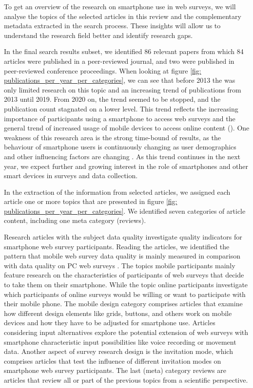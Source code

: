 To get an overview of the research on smartphone use in web surveys, we will analyse the topics of the selected articles in this review and the complementary metadata extracted in the search process. These insights will allow us to understand the research field better and identify research gaps. 

In the final search results subset, we identified 86 relevant papers from which 84 articles were published in a peer-reviewed journal, and two were published in peer-reviewed conference proceedings. When looking at figure \ref{fig: publications_per_year_per_categories}, we can see that before 2013 the was only limited research on this topic and an increasing trend of publications from 2013 until 2019. From 2020 on, the trend seemed to be stopped, and the publication count stagnated on a lower level. This trend reflects the increasing importance of participants using a smartphone to access web surveys and the general trend of increased usage of mobile devices to access online content (\cite{weigold_computerized_2021}). One weakness of this research area is the strong time-bound of results, as the behaviour of smartphone users is continuously changing as user demographics and other influencing factors are changing \cite{brohl_desktop_2018}. As this trend continues in the next year, we expect further and growing interest in the role of smartphones and other smart devices in surveys and data collection.  

In the extraction of the information from selected articles, we assigned each article one or more topics that are presented in figure \ref{fig: publications_per_year_per_categories}. We identified seven categories of article content, including one meta category (reviews). 

Research articles with the subject data quality investigate quality indicators for smartphone web survey participants. Reading the articles, we identified the pattern that mobile web survey data quality is mainly measured in comparison with data quality on PC web surveys \cite{de_bruijne_comparing_2013, ha_data_2020}. The topics mobile participants mainly feature research on the characteristics of participants of web surveys that decide to take them on their smartphone. While the topic online participants investigate which participants of online surveys would be willing or want to participate with their mobile phone. The mobile design category comprises articles that examine how different design elements like grids, buttons, and others work on mobile devices and how they have to be adjusted for smartphone use. Articles considering input alternatives explore the potential extension of web surveys with smartphone characteristic input possibilities like voice recording or movement data. Another aspect of survey research design is the invitation mode, which comprises articles that test the influence of different invitation modes on smartphone web survey participants. The last (meta) category reviews are articles that review all or part of the previous topics from a scientific perspective. 

